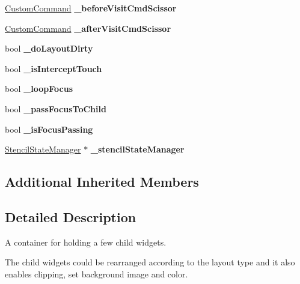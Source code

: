 \begin{DoxyCompactItemize}
\item 
\mbox{\label{classui_1_1Layout_a1bb36c8a331e9e91ed0d75748c0a1b7c}} 
\hyperlink{classCustomCommand}{Custom\+Command} {\bfseries \+\_\+before\+Visit\+Cmd\+Scissor}
\item 
\mbox{\label{classui_1_1Layout_a4331206d098c39d8497e37ffd1f9d7bc}} 
\hyperlink{classCustomCommand}{Custom\+Command} {\bfseries \+\_\+after\+Visit\+Cmd\+Scissor}
\item 
\mbox{\label{classui_1_1Layout_a1d7b6b4f256b6912c1fcecb9e83c6fad}} 
bool {\bfseries \+\_\+do\+Layout\+Dirty}
\item 
\mbox{\label{classui_1_1Layout_a03bf59a9ce22ef94951d7ac4b36ed5fe}} 
bool {\bfseries \+\_\+is\+Intercept\+Touch}
\item 
\mbox{\label{classui_1_1Layout_aaaed8409ebd8b79de56a49313e16f72a}} 
bool {\bfseries \+\_\+loop\+Focus}
\item 
\mbox{\label{classui_1_1Layout_ab71002c56cd6ef79af77f1722c0dfdbf}} 
bool {\bfseries \+\_\+pass\+Focus\+To\+Child}
\item 
\mbox{\label{classui_1_1Layout_a0017459f7a1c92c132fe1013d6cab1de}} 
bool {\bfseries \+\_\+is\+Focus\+Passing}
\item 
\mbox{\label{classui_1_1Layout_abf16383d9427f210b29dd9f64cce4c33}} 
\hyperlink{classStencilStateManager}{Stencil\+State\+Manager} $\ast$ {\bfseries \+\_\+stencil\+State\+Manager}
\end{DoxyCompactItemize}
\subsection*{Additional Inherited Members}


\subsection{Detailed Description}
A container for holding a few child widgets. 

The child widgets could be rearranged according to the layout type and it also enables clipping, set background image and color.

